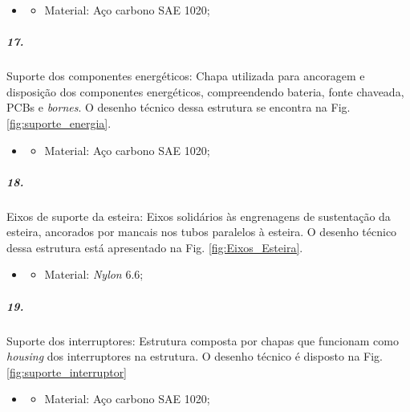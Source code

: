 \begin{itemize}
   \item[]
   \begin{itemize}
       \item Material: Aço carbono SAE 1020;
   \end{itemize}
   \end{itemize} 

 \subparagraph*{17.} \label{retorno_suporte_energia}
 Suporte dos componentes energéticos: Chapa utilizada para ancoragem e disposição dos componentes energéticos, compreendendo bateria, fonte chaveada, PCBs e \textit{bornes}. O desenho técnico dessa estrutura se encontra na Fig. \ref{fig:suporte_energia}.
 
  \begin{itemize}
   \item[]
   \begin{itemize}
       \item Material: Aço carbono SAE 1020;
   \end{itemize}
   \end{itemize} 
  
 \subparagraph*{18.} \label{retorno_Eixos_Esteira}
 Eixos de suporte da esteira: Eixos solidários às engrenagens de sustentação da esteira, ancorados por mancais nos tubos paralelos à esteira. O desenho técnico dessa estrutura está apresentado na Fig. \ref{fig:Eixos_Esteira}.
 
 \begin{itemize}
   \item[]
   \begin{itemize}
       \item Material: \textit{Nylon} 6.6;
   \end{itemize}
   \end{itemize} 
  
  \subparagraph*{19.} \label{retorno_suporte_interruptor}
  Suporte dos interruptores: Estrutura composta por chapas que funcionam como \textit{housing} dos interruptores na estrutura. O desenho técnico é disposto na Fig. \ref{fig:suporte_interruptor}
  
  \begin{itemize}
   \item[]
   \begin{itemize}
       \item Material: Aço carbono SAE 1020;
   \end{itemize}
   \end{itemize} 
   
